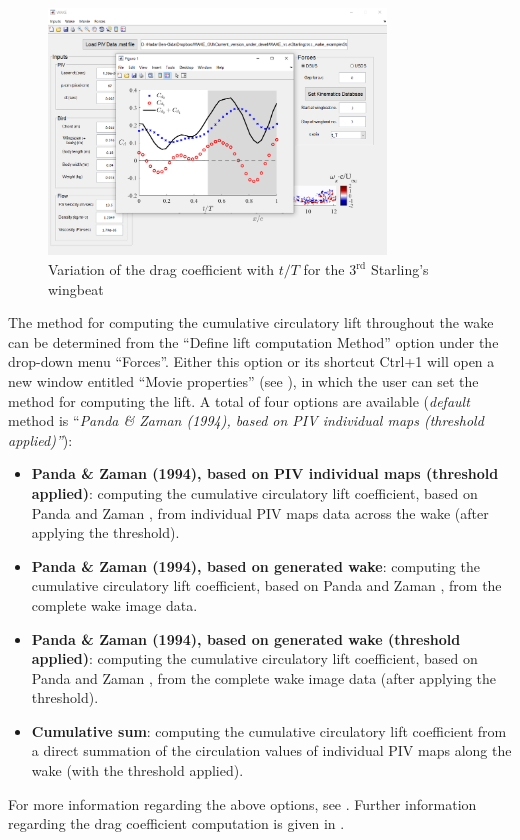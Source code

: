 \documentclass[12pt,a4paper]{article}
\begin{document}
\begin{figure}[ht!]
	\centering
	\includegraphics[width=0.8\textwidth]{drag-plot}
	\caption{Variation of the drag coefficient with $t/T$ for the $3^\mathrm{rd}$ Starling's wingbeat}
	\label{fig:GUI-drag-plot}
\end{figure}

\newpage
The method for computing the cumulative circulatory lift throughout the wake can be determined from the ``Define lift computation Method'' option under the drop-down menu ``Forces''. 
Either this option or its shortcut Ctrl+1 will open a new window entitled ``Movie properties'' (see ), in which the user can set the method for computing the lift. A total of four options are available (\textit{default} method is ``\textit{Panda \& Zaman (1994), based on PIV individual maps (threshold applied)''}):
\begin{itemize}
	\item \textbf{Panda \& Zaman (1994), based on PIV individual maps (threshold applied)}: computing the cumulative circulatory lift coefficient, based on Panda and Zaman \cite{Panda1994}, from individual PIV maps data across the wake (after applying the threshold).
	\item \textbf{Panda \& Zaman (1994), based on generated wake}: computing the cumulative circulatory lift coefficient, based on Panda and Zaman \cite{Panda1994}, from the complete wake image data.
	\item \textbf{Panda \& Zaman (1994), based on generated wake (threshold applied)}: computing the cumulative circulatory lift coefficient, based on Panda and Zaman \cite{Panda1994}, from the complete wake image data (after applying the threshold).
	\item \textbf{Cumulative sum}: computing the cumulative circulatory lift coefficient from a direct summation of the circulation values of individual PIV maps along the wake (with the threshold applied).   
\end{itemize}
For more information regarding the above options, see . Further information regarding the drag coefficient computation is given in .
\end{document}
